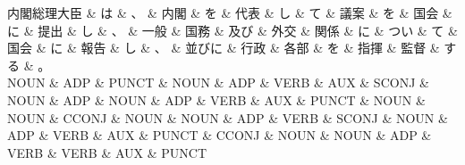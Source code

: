 \documentclass[tikz,border=5pt]{standalone}
\begin{document}
\small
\begin{dependency}[edge unit distance=12.0pt]
    \begin{deptext}[column sep=0.5em]
        内閣総理大臣 \& は \& 、 \& 内閣 \& を \& 代表 \& し \& て \& 議案 \& を \& 国会 \& に \& 提出 \& し \& 、 \& 一般 \& 国務 \& 及び \& 外交 \& 関係 \& に \& つい \& て \& 国会 \& に \& 報告 \& し \& 、 \& 並びに \& 行政 \& 各部 \& を \& 指揮 \& 監督 \& する \& 。\\
        NOUN \& ADP \& PUNCT \& NOUN \& ADP \& VERB \& AUX \& SCONJ \& NOUN \& ADP \& NOUN \& ADP \& VERB \& AUX \& PUNCT \& NOUN \& NOUN \& CCONJ \& NOUN \& NOUN \& ADP \& VERB \& SCONJ \& NOUN \& ADP \& VERB \& AUX \& PUNCT \& CCONJ \& NOUN \& NOUN \& ADP \& VERB \& VERB \& AUX \& PUNCT\\
    \end{deptext}
\end{dependency}
\end{document}

